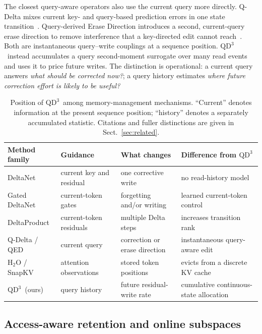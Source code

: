 \documentclass[pdflatex,sn-mathphys-num]{sn-jnl}
\theoremstyle{thmstyleone}
\newcommand{\QDDD}{\ensuremath{\mathrm{QD}^{3}}}
\begin{document}
The closest query-aware operators also use the current query more directly. Q-Delta mixes current key- and query-based prediction errors in one state transition~\cite{park2026qdelta}. Query-derived Erase Direction introduces a second, current-query erase direction to remove interference that a key-directed edit cannot reach~\cite{gupta2026qed}. Both are instantaneous query--write couplings at a sequence position. \QDDD\ instead accumulates a query second-moment surrogate over many read events and uses it to price future writes. The distinction is operational: a current query answers \emph{what should be corrected now?}; a query history estimates \emph{where future correction effort is likely to be useful?}

\begin{table}[t]
\caption{Position of \QDDD\ among memory-management mechanisms. ``Current'' denotes information at the present sequence position; ``history'' denotes a separately accumulated statistic. Citations and fuller distinctions are given in Sect.~\ref{sec:related}.}
\label{tab:related}
\centering
\small
\setlength{\tabcolsep}{3pt}
\begin{tabular}{@{}p{}p{}p{}p{}@{}}
\toprule
Method family & Guidance & What changes & Difference from \QDDD \\
\midrule
DeltaNet & current key and residual & one corrective write & no read-history model \\
Gated DeltaNet & current-token gates & forgetting and/or writing & learned current-token control \\
DeltaProduct & current-token residuals & multiple Delta steps & increases transition rank \\
Q-Delta / QED & current query & correction or erase direction & instantaneous query-aware edit \\
H$_2$O / SnapKV & attention observations & stored token positions & evicts from a discrete KV cache \\
\QDDD\ (ours) & query history & future residual-write rate & cumulative continuous-state allocation \\
\bottomrule
\end{tabular}
\end{table}

\subsection{Access-aware retention and online subspaces}
\end{document}
